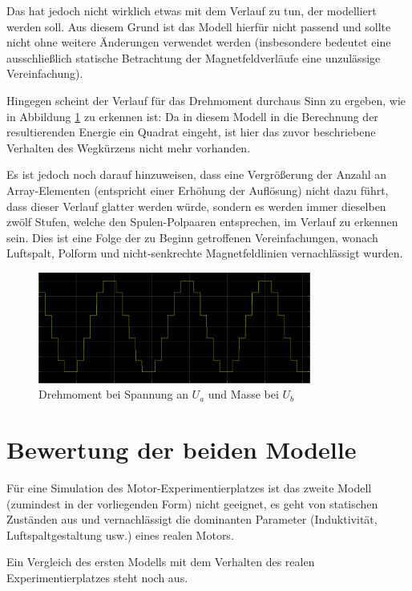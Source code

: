 Das hat jedoch nicht wirklich etwas mit dem Verlauf zu tun, der modelliert werden soll. Aus diesem Grund ist das Modell hierfür nicht passend und sollte nicht ohne weitere Änderungen verwendet werden (insbesondere bedeutet eine ausschließlich statische Betrachtung der Magnetfeldverläufe eine unzulässige Vereinfachung).

Hingegen scheint der Verlauf für das Drehmoment durchaus Sinn zu ergeben, wie in Abbildung \ref{FigDrehmoment} zu erkennen ist: Da in diesem Modell in die Berechnung der resultierenden  Energie ein Quadrat eingeht, ist hier das zuvor beschriebene Verhalten des Wegkürzens nicht mehr vorhanden. 

Es ist jedoch noch darauf hinzuweisen, dass eine Vergrößerung der Anzahl an Array-Elementen (entspricht einer Erhöhung der Auflösung) nicht dazu führt, dass dieser Verlauf glatter werden würde, sondern es werden immer dieselben zwölf Stufen, welche den Spulen-Polpaaren entsprechen, im Verlauf zu erkennen sein.
Dies ist eine Folge der zu Beginn getroffenen Vereinfachungen, wonach Luftspalt, Polform und nicht-senkrechte Magnetfeldlinien vernachlässigt wurden.

\begin{figure}[htbp]
	\centering
	\includegraphics[width=0.8\textwidth]{./sim/pictures/drehmoment.png}
	\caption{Drehmoment bei Spannung an $U_a$ und Masse bei $U_b$}
	\label{FigDrehmoment}
\end{figure}

\section{Bewertung der beiden Modelle}
Für eine Simulation des Motor-Experimentierplatzes ist das zweite Modell (zumindest in der vorliegenden Form) nicht geeignet, es geht von statischen Zuständen aus und vernachlässigt die dominanten Parameter (Induktivität, Luftspaltgestaltung usw.) eines realen Motors.

Ein Vergleich des ersten Modells mit dem Verhalten des realen Experimentierplatzes steht noch aus.

